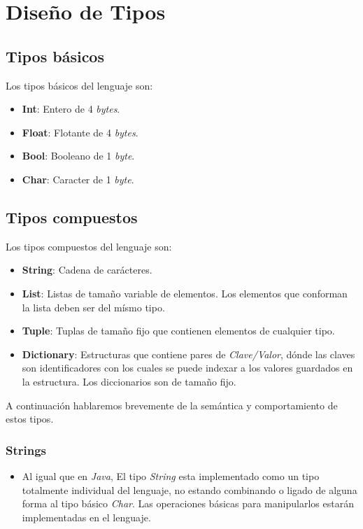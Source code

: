 \documentclass[12pt, spanish]{report}
\begin{document}
\section{Dise\~no de Tipos}
\label{sec:tipos}

\subsection{Tipos b\'asicos}
\label{sec:tiposbasicos}

Los tipos b\'asicos del lenguaje son:

\begin{itemize}
\item \textbf{Int}: Entero de 4 \emph{bytes}.
\item \textbf{Float}: Flotante de 4 \emph{bytes}.
\item \textbf{Bool}: Booleano de 1 \emph{byte}.
\item \textbf{Char}: Caracter de 1 \emph{byte}.
\end{itemize}

\subsection{Tipos compuestos}
\label{sec:tiposcompuestos}

Los tipos compuestos del lenguaje son:

\begin{itemize}
\item \textbf{String}: Cadena de car\'acteres.
\item \textbf{List}: Listas de tamaño variable de elementos. Los
  elementos que conforman la lista deben ser del mísmo tipo.
\item \textbf{Tuple}: Tuplas de tamaño fijo que contienen elementos de
  cualquier tipo.
\item \textbf{Dictionary}: Estructuras que contiene pares de
  \emph{Clave/Valor}, dónde las claves son identificadores con los
  cuales se puede indexar a los valores guardados en la
  estructura. Los diccionarios son de tamaño fijo.
\end{itemize}

A continuaci\'on hablaremos brevemente de la sem\'antica y
comportamiento de estos tipos.

\subsubsection{Strings}
\label{sec:strings}
\begin{itemize}
\item Al igual que en \emph{Java}, El tipo \emph{String} esta
  implementado como un tipo totalmente individual del lenguaje, no
  estando combinando o ligado de alguna forma al tipo b\'asico
  \emph{Char}. Las operaciones básicas para manipularlos estarán
  implementadas en el lenguaje.
\end{itemize}
\end{document}
